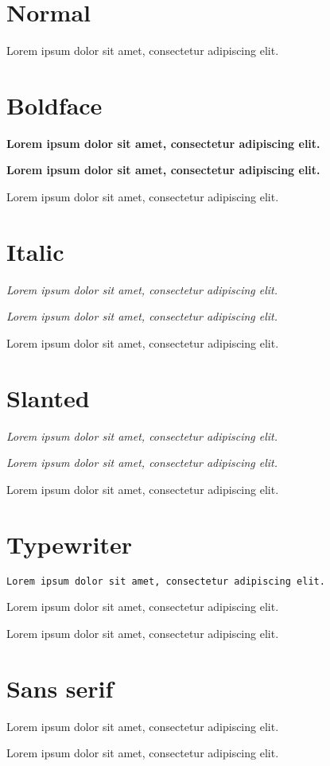 \documentclass{article}
\newcommand{\lorem}{Lorem ipsum dolor sit amet, consectetur adipiscing elit.}
\begin{document}
\section*{Normal}

\begin{rm}
\lorem
\end{rm}

\section*{Boldface}

\textbf{\lorem}

{\bfseries \lorem}

\begin{bf}
\lorem
\end{bf}

\section*{Italic}

\textit{\lorem}

{\itshape \lorem}

\begin{it}
\lorem
\end{it}

\section*{Slanted}

\textsl{\lorem}

{\slshape \lorem}

\begin{sl}
\lorem
\end{sl}

\section*{Typewriter}

\texttt{\lorem}

{\ttfamily \lorem}

\begin{tt}
\lorem
\end{tt}

\section*{Sans serif}

\textsf{\lorem}

{\sffamily \lorem}
\end{document}
